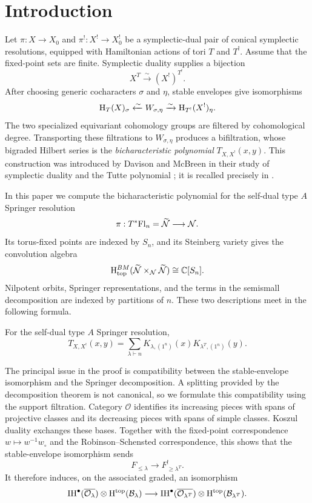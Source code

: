 \section{Introduction}

Let $\pi:X\to X_0$ and $\pi^!:X^!\to X_0^!$ be a symplectic-dual pair
of conical symplectic resolutions, equipped with Hamiltonian actions of
tori $T$ and $T^!$. Assume that the fixed-point sets are finite.
Symplectic duality supplies a bijection
\[
  X^T\xrightarrow{\sim}(X^!)^{T^!}.
\]
After choosing generic cocharacters $\sigma$ and $\eta$, stable
envelopes give isomorphisms
\[
  \mathrm{H}_T(X)_\sigma
  \xleftarrow{\sim}W_{\sigma,\eta}
  \xrightarrow{\sim}
  \mathrm{H}_{T^!}(X^!)_\eta.
\]
The two specialized equivariant cohomology groups are filtered by
cohomological degree. Transporting these filtrations to
$W_{\sigma,\eta}$ produces a bifiltration, whose bigraded Hilbert series
is the \emph{bicharacteristic polynomial} $T_{X,X^!}(x,y)$. This
construction was introduced by Davison and McBreen in their study of
symplectic duality and the Tutte polynomial \cite{mcbreen2025}; it is
recalled precisely in .

In this paper we compute the bicharacteristic polynomial for the
self-dual type $A$ Springer resolution
\[
  \pi:T^*\mathrm{Fl}_n=\widetilde{\mathcal N}\longrightarrow\mathcal N.
\]
Its torus-fixed points are indexed by $S_n$, and its Steinberg variety
gives the convolution algebra
\[
  \mathrm{H}^{BM}_{\mathrm{top}}
    (\widetilde{\mathcal N}\times_{\mathcal N}
     \widetilde{\mathcal N})
  \cong\mathbb C[S_n].
\]
Nilpotent orbits, Springer representations, and the terms in the
semismall decomposition are indexed by partitions of $n$. These two
descriptions meet in the following formula.

\begin{theorem}{}
  For the self-dual type $A$ Springer resolution,
  \[
    T_{X,X^!}(x,y)
    =\sum_{\lambda\vdash n}
      K_{\lambda,(1^n)}(x)K_{\lambda^T,(1^n)}(y).
  \]
\end{theorem}

The principal issue in the proof is compatibility between the
stable-envelope isomorphism and the Springer decomposition. A splitting
provided by the decomposition theorem is not canonical, so we formulate
this compatibility using the support filtration. Category $\mathcal O$
identifies its increasing pieces with spans of projective classes and
its decreasing pieces with spans of simple classes. Koszul duality
exchanges these bases. Together with the fixed-point correspondence
$w\mapsto w^{-1}w_\circ$ and the Robinson--Schensted correspondence,
this shows that the stable-envelope isomorphism sends
\[
  F_{\leq\lambda}\longrightarrow F^!_{\geq\lambda^T}.
\]
It therefore induces, on the associated graded, an isomorphism
\[
  \mathrm{IH}^\bullet(\overline{\mathcal O_\lambda})
    \otimes\mathrm{H}^\mathrm{top}(\mathcal B_\lambda)
  \longrightarrow
  \mathrm{IH}^\bullet(\overline{\mathcal O_{\lambda^T}})
    \otimes\mathrm{H}^\mathrm{top}(\mathcal B_{\lambda^T}).
\]

